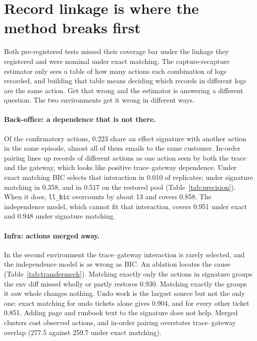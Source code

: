 \documentclass[11pt]{article}
\begin{document}
\section{Record linkage is where the method breaks first}
\label{sec:linkage}

Both pre-registered tests missed their coverage bar under the linkage they
registered and were nominal under exact matching. The capture-recapture
estimator only sees a table of how many actions each combination of logs
recorded, and building that table means deciding which records in different
logs are the same action. Get that wrong and the estimator is answering a
different question. The two environments get it wrong in different ways.

\paragraph{Back-office: a dependence that is not there.}
Of the confirmatory actions, 0.223 share an effect signature with another action
in the same episode, almost all of them emails to the same customer. In-order
pairing lines up records of different actions as one action seen by both the
trace and the gateway, which looks like positive trace--gateway dependence. Under
exact matching BIC selects that interaction in 0.010 of replicates; under
signature matching in 0.358, and in 0.517 on the restored pool
(Table~\ref{tab:precision}). When it does, \texttt{ll\_bic} overcounts by about
13 and covers 0.858. The independence model, which cannot fit that interaction,
covers 0.951 under exact and 0.948 under signature matching.

\paragraph{Infra: actions merged away.}
In the second environment the trace--gateway interaction is rarely selected, and
the independence model is as wrong as BIC. An ablation locates the cause
(Table~\ref{tab:transfermech}).
Matching exactly only the actions in signature groups the env diff missed wholly
or partly restores 0.930. Matching exactly the groups it saw whole changes
nothing. Undo work is the largest source but not the only one: exact matching for
undo tickets alone gives 0.904, and for every other ticket 0.851. Adding page and
runbook text to the signature does not help. Merged clusters cost observed
actions, and in-order pairing overstates trace--gateway overlap (277.5 against
259.7 under exact matching).
\end{document}
